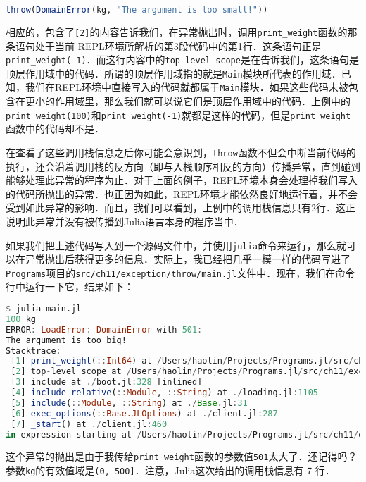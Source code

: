 \begin{lstlisting}[language=julia]
throw(DomainError(kg, "The argument is too small!"))
\end{lstlisting}

相应的，包含了\verb|[2]|的内容告诉我们，在异常抛出时，调用\verb|print_weight|函数的那条语句处于当前 REPL环境所解析的第3段代码中的第1行．这条语句正是\verb|print_weight(-1)|．而这行内容中的\verb|top-level scope|是在告诉我们，这条语句是顶层作用域中的代码．所谓的顶层作用域指的就是\verb|Main|模块所代表的作用域．已知，我们在REPL环境中直接写入的代码就都属于\verb|Main|模块．如果这些代码未被包含在更小的作用域里，那么我们就可以说它们是顶层作用域中的代码．上例中的\verb|print_weight(100)|和\verb|print_weight(-1)|就都是这样的代码，但是\verb|print_weight|函数中的代码却不是．

在查看了这些调用栈信息之后你可能会意识到，\verb|throw|函数不但会中断当前代码的执行，还会沿着调用栈的反方向（即与入栈顺序相反的方向）传播异常，直到碰到能够处理此异常的程序为止．对于上面的例子，REPL环境本身会处理掉我们写入的代码所抛出的异常．也正因为如此，REPL环境才能依然良好地运行着，并不会受到如此异常的影响．而且，我们可以看到，上例中的调用栈信息只有2行．这正说明此异常并没有被传播到Julia语言本身的程序当中．

如果我们把上述代码写入到一个源码文件中，并使用\verb|julia|命令来运行，那么就可以在异常抛出后获得更多的信息．实际上，我已经把几乎一模一样的代码写进了\verb|Programs|项目的\verb|src/ch11/exception/throw/main.jl|文件中．现在，我们在命令行中运行一下它，结果如下：

\begin{lstlisting}[language=julia]
$ julia main.jl 
100 kg
ERROR: LoadError: DomainError with 501:
The argument is too big!
Stacktrace:
 [1] print_weight(::Int64) at /Users/haolin/Projects/Programs.jl/src/ch11/exception/throw/main.jl:11
 [2] top-level scope at /Users/haolin/Projects/Programs.jl/src/ch11/exception/throw/main.jl:17
 [3] include at ./boot.jl:328 [inlined]
 [4] include_relative(::Module, ::String) at ./loading.jl:1105
 [5] include(::Module, ::String) at ./Base.jl:31
 [6] exec_options(::Base.JLOptions) at ./client.jl:287
 [7] _start() at ./client.jl:460
in expression starting at /Users/haolin/Projects/Programs.jl/src/ch11/exception/throw/main.jl:17
\end{lstlisting}

这个异常的抛出是由于我传给\verb|print_weight|函数的参数值\verb|501|太大了．还记得吗？参数\verb|kg|的有效值域是\verb|(0, 500]|．注意，Julia这次给出的调用栈信息有 7 行．

